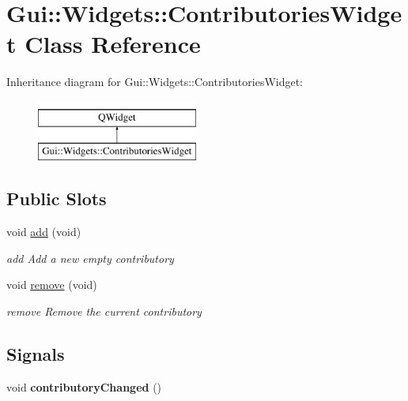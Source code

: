 \hypertarget{classGui_1_1Widgets_1_1ContributoriesWidget}{\section{Gui\+:\+:Widgets\+:\+:Contributories\+Widget Class Reference}
\label{classGui_1_1Widgets_1_1ContributoriesWidget}
}
Inheritance diagram for Gui\+:\+:Widgets\+:\+:Contributories\+Widget\+:\begin{figure}[H]
\begin{center}
\leavevmode
\includegraphics[height=2.000000cm]{dc/da3/classGui_1_1Widgets_1_1ContributoriesWidget}
\end{center}
\end{figure}
\subsection*{Public Slots}
\begin{DoxyCompactItemize}
\item 
\hypertarget{classGui_1_1Widgets_1_1ContributoriesWidget_a756c0d1076fad1a3805975343e66a1de}{void \hyperlink{classGui_1_1Widgets_1_1ContributoriesWidget_a756c0d1076fad1a3805975343e66a1de}{add} (void)}\label{classGui_1_1Widgets_1_1ContributoriesWidget_a756c0d1076fad1a3805975343e66a1de}

\begin{DoxyCompactList}\small\item\em add Add a new empty contributory \end{DoxyCompactList}\item 
\hypertarget{classGui_1_1Widgets_1_1ContributoriesWidget_a35895ad0b9c497263f633680288b414e}{void \hyperlink{classGui_1_1Widgets_1_1ContributoriesWidget_a35895ad0b9c497263f633680288b414e}{remove} (void)}\label{classGui_1_1Widgets_1_1ContributoriesWidget_a35895ad0b9c497263f633680288b414e}

\begin{DoxyCompactList}\small\item\em remove Remove the current contributory \end{DoxyCompactList}\end{DoxyCompactItemize}
\subsection*{Signals}
\begin{DoxyCompactItemize}
\item 
\hypertarget{classGui_1_1Widgets_1_1ContributoriesWidget_a510bfd755cf271fd10b63cf68284cd02}{void {\bfseries contributory\+Changed} ()}\label{classGui_1_1Widgets_1_1ContributoriesWidget_a510bfd755cf271fd10b63cf68284cd02}

\end{DoxyCompactItemize}
